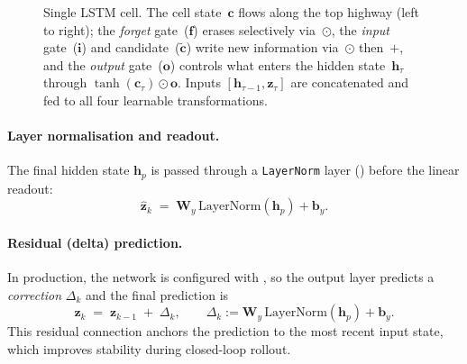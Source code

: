 \documentclass{report}
\theoremstyle{plain}
\theoremstyle{remark}
\numberwithin{equation}{section}              %
\begin{document}
\begin{figure}[h]
\caption{Single LSTM cell.
The cell state~$\mathbf{c}$ flows along the top highway (left to right);
the \emph{forget} gate~($\mathbf{f}$) erases selectively via~$\odot$,
the \emph{input} gate~($\mathbf{i}$) and candidate~($\tilde{\mathbf{c}}$)
write new information via~$\odot$ then~$+$,
and the \emph{output} gate~($\mathbf{o}$) controls what enters the hidden
state~$\mathbf{h}_\tau$ through $\tanh(\mathbf{c}_\tau)\odot\mathbf{o}$.
Inputs $[\mathbf{h}_{\tau-1},\mathbf{z}_\tau]$ are concatenated and fed
to all four learnable transformations.}
\label{fig:lstm_cell}
\end{figure}

\paragraph{Layer normalisation and readout.}
The final hidden state $\mathbf{h}_{p}$ is passed through a
\texttt{LayerNorm} layer () before the linear
readout:
\begin{equation}\label{eq:lstm_readout}
  \widehat{\mathbf{z}}_{k} \;=\;
  \mathbf{W}_y\,\mathrm{LayerNorm}(\mathbf{h}_{p}) + \mathbf{b}_y.
\end{equation}

\paragraph{Residual (delta) prediction.}
In production, the network is configured with , so
the output layer predicts a \emph{correction} $\Delta_k$ and the final
prediction is
\begin{equation}\label{eq:lstm_residual}
  \widehat{\mathbf{z}}_{k} \;=\;
  \mathbf{z}_{k-1} \;+\; \Delta_k,
  \qquad
  \Delta_k := \mathbf{W}_y\,\mathrm{LayerNorm}(\mathbf{h}_{p}) + \mathbf{b}_y.
\end{equation}
This residual connection anchors the prediction to the most recent input
state, which improves stability during closed-loop rollout.
\end{document}

